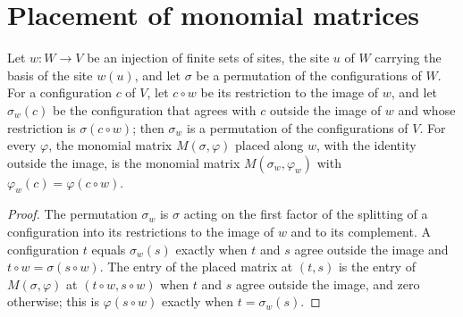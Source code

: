 \section{Placement of monomial matrices}
\label{sec:circuitplacement_monomial}

\begin{lemma}
    \label{lem:sites_place_along_monomial}
    \leanok
    Let $w\colon W\to V$ be an injection of finite sets of sites, the site $u$ of
    $W$ carrying the basis of the site $w(u)$, and let $\sigma$ be a
    permutation of the configurations of $W$. For a configuration $c$ of $V$,
    let $c\circ w$ be its restriction to the image of $w$, and let
    $\sigma_w(c)$ be the configuration that agrees with $c$ outside the image of
    $w$ and whose restriction is $\sigma(c\circ w)$; then $\sigma_w$ is a
    permutation of the configurations of $V$. For every $\varphi$, the monomial
    matrix $M(\sigma,\varphi)$ placed along $w$, with the identity outside the
    image, is the monomial matrix $M(\sigma_w,\varphi_w)$ with
    $\varphi_w(c)=\varphi(c\circ w)$.
\end{lemma}

\begin{proof}\leanok
    The permutation $\sigma_w$ is $\sigma$ acting on the first factor of the
    splitting of a configuration into its restrictions to the image of $w$ and
    to its complement. A configuration $t$ equals $\sigma_w(s)$ exactly when
    $t$ and $s$ agree outside the image and $t\circ w=\sigma(s\circ w)$. The
    entry of the placed matrix at $(t,s)$ is the entry of $M(\sigma,\varphi)$ at
    $(t\circ w,s\circ w)$ when $t$ and $s$ agree outside the image, and zero
    otherwise; this is $\varphi(s\circ w)$ exactly when $t=\sigma_w(s)$.
\end{proof}
